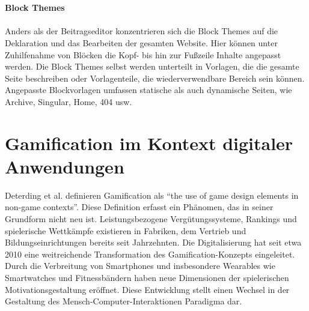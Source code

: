 \\\\
\textbf{Block Themes}
\\\\
Anders als der Beitragseditor konzentrieren sich die Block Themes auf die Deklaration und das Bearbeiten der gesamten Website.
Hier können unter Zuhilfenahme von Blöcken die Kopf- bis hin zur Fußzeile Inhalte angepasst werden.
Die Block Themes selbst werden unterteilt in Vorlagen, die die gesamte Seite beschreiben oder Vorlagenteile, die wiederverwendbare Bereich sein können.
Angepasste Blockvorlagen umfassen statische als auch dynamische Seiten, wie Archive, Singular, Home, 404 usw. \cite{wordpress2024EditorTemplates}


\section{Gamification im Kontext digitaler Anwendungen}

Deterding et al. definieren Gamification als ``the use of game design elements in non-game contexts''.\cite{deterding2011gamification}
Diese Definition erfasst ein Phänomen, das in seiner Grundform nicht neu ist.
Leistungsbezogene Vergütungssysteme, Rankings und spielerische Wettkämpfe existieren in Fabriken, dem Vertrieb und Bildungseinrichtungen bereits seit Jahrzehnten.\cite{bpb2023gamification}
Die Digitalisierung hat seit etwa 2010 eine weitreichende Transformation des Gamification-Konzepts eingeleitet.
Durch die Verbreitung von Smartphones und insbesondere Wearables wie Smartwatches und Fitnessbändern haben neue Dimensionen der spielerischen Motivationsgestaltung eröffnet.\cite{sailer2016gamification}
Diese Entwicklung stellt einen Wechsel in der Gestaltung des Mensch-Computer-Interaktionen Paradigma dar.

